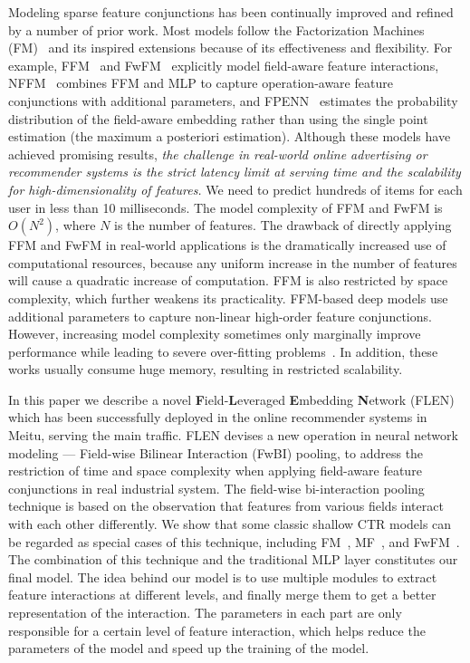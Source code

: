 \documentclass[sigconf]{acmart}
\begin{document}
Modeling sparse feature conjunctions has been continually improved and refined by a number of prior work. 
Most models follow the Factorization Machines (FM)~\citep{rendle2010factorization} and its inspired extensions because of its effectiveness and flexibility. 
For example, FFM~\citep{juan2017field} and FwFM~\citep{pan2018field,deng2020sparse} explicitly model field-aware feature interactions, NFFM~\citep{Yang2019Operation} combines FFM and MLP to capture operation-aware feature conjunctions with additional parameters, and FPENN~\citep{Liu2018Field} estimates the probability distribution of the field-aware embedding rather than using the single point estimation (the maximum a posteriori estimation).
Although these models have achieved promising results, \textit{the challenge in real-world online advertising or recommender systems is the strict latency limit at serving time and the scalability for high-dimensionality of features.} We need to predict hundreds of items for each user in less than 10 milliseconds.
The model complexity of FFM and FwFM is $O(N^2)$, where $N$ is the number of features. The drawback of directly applying FFM and FwFM in real-world applications is the dramatically increased use of computational resources, because any uniform increase in the number of features will cause a quadratic increase of computation.  
FFM is also restricted by space complexity, which further weakens its practicality. 
FFM-based deep models use additional parameters to capture non-linear high-order
feature conjunctions. However, increasing model complexity sometimes only marginally improve performance while leading to severe over-fitting problems~\citep{he2017neural}. In addition, these works usually consume huge memory, resulting in restricted scalability.

In this paper we describe a novel \textbf{F}ield-\textbf{L}everaged \textbf{E}mbedding \textbf{N}etwork (FLEN) which has been successfully deployed in the online recommender systems in Meitu, serving the main traffic. FLEN devises a new operation in neural network modeling — Field-wise Bilinear Interaction (FwBI) pooling, to address the restriction of time and space complexity when applying field-aware feature conjunctions in real industrial system.
The field-wise bi-interaction pooling technique is based on the observation that features from various fields interact with each other differently.
We show that some classic shallow CTR models can be regarded as special cases of this technique, including FM~\citep{rendle2010factorization}, MF~\citep{Koren2009Matrix},  and FwFM~\citep{pan2018field}.
The combination of this technique and the traditional MLP layer constitutes our final model. The idea behind our model is to use multiple modules to extract feature interactions at different levels, and finally merge them to get a better representation of the interaction. 
The parameters in each part are only responsible for a certain level of feature interaction, which helps reduce the parameters of the model and speed up the training of the model.
\end{document}
